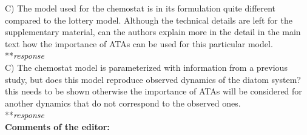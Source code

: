 \documentclass[letterpaper,11pt]{article}
\begin{document}
\noindent C) The model used for the chemostat is in its formulation quite different compared to the lottery model. Although the technical details are left for the supplementary material, can the authors explain more in the detail in the main text how the importance of ATAs can be used for this particular model. \\

\noindent ***\emph{response} \\

\noindent C) The chemostat model is parameterized with information from a previous study, but does this model reproduce observed dynamics of the diatom system? this needs to be shown otherwise the importance of ATAs will be considered for another dynamics that do not correspond to the observed ones. \\

\noindent ***\emph{response} \\

\noindent \textbf{Comments of the editor:} \\
\end{document}
